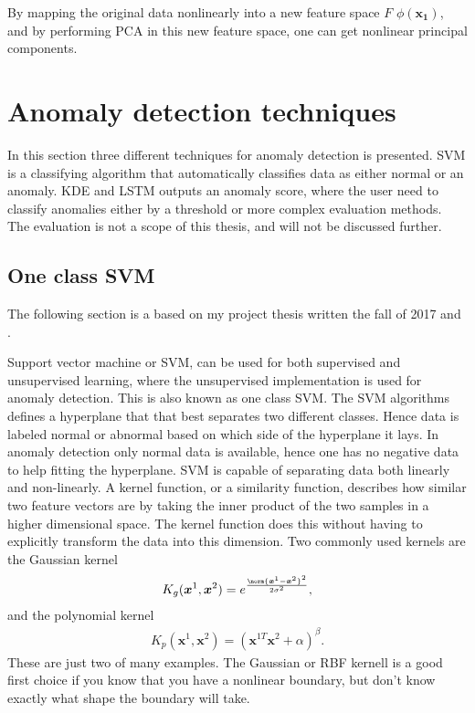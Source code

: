         By mapping the original data nonlinearly into a new feature space $F$ $\phi(\bm{x_1})$, and by performing PCA in this new feature space, one can get nonlinear principal components.


\section{Anomaly detection techniques}
    In this section three different techniques for anomaly detection is presented. SVM is a classifying algorithm that automatically classifies data as either normal or an anomaly. KDE and LSTM outputs an anomaly score, where the user need to classify anomalies either by a threshold or more complex evaluation methods. The evaluation is not a scope of this thesis, and will not be discussed further. 
    
    \subsection{One class SVM}\label{subsec:OCSVM}
    
            The following section is a based on my project thesis written the fall of 2017 and \cite{Hastie}. 
            
            Support vector machine or SVM, can be used for both supervised and unsupervised learning, where the unsupervised implementation is used for anomaly detection. This is also known as one class SVM. The SVM algorithms defines a hyperplane that that best separates two different classes. Hence data is labeled normal or abnormal based on which side of the hyperplane it lays. In anomaly detection only normal data is available, hence one has no negative data to help fitting the hyperplane. SVM is capable of separating data both linearly and non-linearly. A kernel function, or a similarity function, describes how similar two feature vectors are by taking the inner product of the two samples in a higher dimensional space. The kernel function does this without having to explicitly transform the data into this dimension. Two commonly used kernels are the Gaussian kernel
            \begin{align}
                K_g(\bm x^{1},\bm x^{2}) = e^{\frac{\norm{\bm x^{1}-\bm x^{2}}^2}{2\sigma^2}}, 
                \label{svm:gauss}
            \end{align}
            and the polynomial kernel
            \begin{align}
                K_p(\bm x^{1},\bm x^{2}) = (\bm x^{1T}\bm x^{2} + \alpha)^\beta.
                \label{svm:poly}
            \end{align}
           These are just two of many examples. The Gaussian or RBF kernell is a good first choice if you know that you have a nonlinear boundary, but don't know exactly what shape the boundary will take.
    
